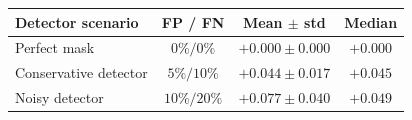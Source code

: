 \begin{tabular}{lccc}
\toprule
\textbf{Detector scenario} & \textbf{FP / FN} & \textbf{Mean $\pm$ std} & \textbf{Median} \\
\midrule
Perfect mask & $0\%/0\%$ & $+0.000\pm0.000$ & $+0.000$ \\
Conservative detector & $5\%/10\%$ & $+0.044\pm0.017$ & $+0.045$ \\
Noisy detector & $10\%/20\%$ & $+0.077\pm0.040$ & $+0.049$ \\
\bottomrule
\end{tabular}
